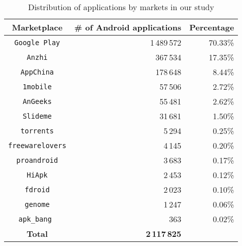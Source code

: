 \begin{table}[!ht]
    \caption{Distribution of applications by markets in our study}
    \label{table:stase:marketplaces}
    \centering
        \begin{tabular}{|c|r|r|}
        \hline
        \textbf{Marketplace} & \textbf{\# of Android applications} & \textbf{Percentage} \\
        \hline
        \texttt{Google Play} & 1\,489\,572 & 70.33\%\\
        \texttt{Anzhi} &  367\,534 & 17.35\%\\
        \texttt{AppChina} &  178\,648 & 8.44\%\\
        \texttt{1mobile} &  57\,506 & 2.72\%\\
        \texttt{AnGeeks} & 55\,481 & 2.62\%\\
        \texttt{Slideme} & 31\,681 & 1.50\%\\
        \texttt{torrents} & 5\,294 & 0.25\%\\
        \texttt{freewarelovers} & 4\,145 & 0.20\%\\
        \texttt{proandroid} & 3\,683 & 0.17\%\\
        \texttt{HiApk} & 2\,453 & 0.12\%\\
        \texttt{fdroid} &  2\,023 & 0.10\%\\
        \texttt{genome} &  1\,247 & 0.06\%\\
        \texttt{apk\_bang } & 363 & 0.02\%\\
        \hline
        \textbf{Total} & \textbf{2\,117\,825} & \\
        \hline
        \end{tabular}
\end{table}
